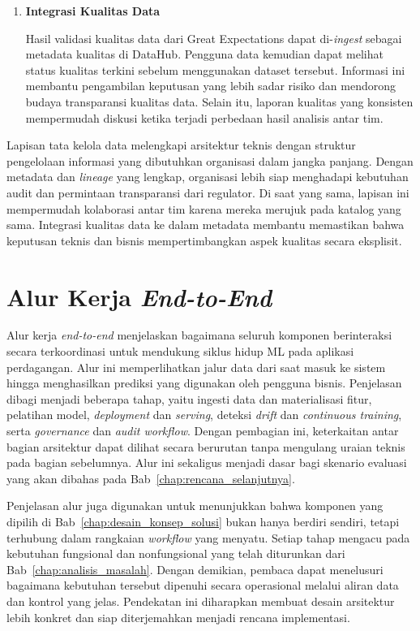 \begin{enumerate}
    \vspace{0.5em}

    \item \textbf{Integrasi Kualitas Data}  

    Hasil validasi kualitas data dari Great Expectations dapat di-\textit{ingest} sebagai metadata kualitas di DataHub. Pengguna data kemudian dapat melihat status kualitas terkini sebelum menggunakan dataset tersebut. Informasi ini membantu pengambilan keputusan yang lebih sadar risiko dan mendorong budaya transparansi kualitas data. Selain itu, laporan kualitas yang konsisten mempermudah diskusi ketika terjadi perbedaan hasil analisis antar tim.

    \vspace{0.5em}
\end{enumerate}

Lapisan tata kelola data melengkapi arsitektur teknis dengan struktur pengelolaan informasi yang dibutuhkan organisasi dalam jangka panjang. Dengan metadata dan \textit{lineage} yang lengkap, organisasi lebih siap menghadapi kebutuhan audit dan permintaan transparansi dari regulator. Di saat yang sama, lapisan ini mempermudah kolaborasi antar tim karena mereka merujuk pada katalog yang sama. Integrasi kualitas data ke dalam metadata membantu memastikan bahwa keputusan teknis dan bisnis mempertimbangkan aspek kualitas secara eksplisit.

\section{Alur Kerja \textit{End-to-End}}

Alur kerja \textit{end-to-end} menjelaskan bagaimana seluruh komponen berinteraksi secara terkoordinasi untuk mendukung siklus hidup ML pada aplikasi perdagangan. Alur ini memperlihatkan jalur data dari saat masuk ke sistem hingga menghasilkan prediksi yang digunakan oleh pengguna bisnis. Penjelasan dibagi menjadi beberapa tahap, yaitu ingesti data dan materialisasi fitur, pelatihan model, \textit{deployment} dan \textit{serving}, deteksi \textit{drift} dan \textit{continuous training}, serta \textit{governance} dan \textit{audit workflow}. Dengan pembagian ini, keterkaitan antar bagian arsitektur dapat dilihat secara berurutan tanpa mengulang uraian teknis pada bagian sebelumnya. Alur ini sekaligus menjadi dasar bagi skenario evaluasi yang akan dibahas pada Bab~\ref{chap:rencana_selanjutnya}.

Penjelasan alur juga digunakan untuk menunjukkan bahwa komponen yang dipilih di Bab~\ref{chap:desain_konsep_solusi} bukan hanya berdiri sendiri, tetapi terhubung dalam rangkaian \textit{workflow} yang menyatu. Setiap tahap mengacu pada kebutuhan fungsional dan nonfungsional yang telah diturunkan dari Bab~\ref{chap:analisis_masalah}. Dengan demikian, pembaca dapat menelusuri bagaimana kebutuhan tersebut dipenuhi secara operasional melalui aliran data dan kontrol yang jelas. Pendekatan ini diharapkan membuat desain arsitektur lebih konkret dan siap diterjemahkan menjadi rencana implementasi.

